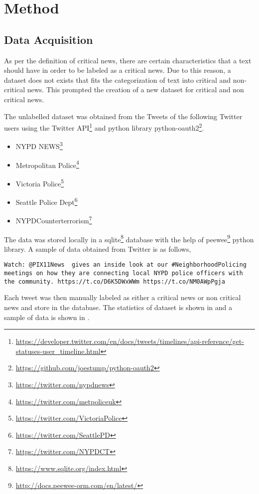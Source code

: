 \chapter{Method} \label{method}

\section{Data Acquisition}
As per the definition of critical news, there are certain characteristics that a text should have in order to be labeled as a critical news. Due to this reason, a dataset does not exists that fits the categorization of text into critical and non-critical news. This prompted the creation of a new dataset for critical and non critical news.\par
The unlabelled dataset was obtained from the Tweets of the following Twitter users using the Twitter API\footnote{\url{https://developer.twitter.com/en/docs/tweets/timelines/api-reference/get-statuses-user_timeline.html}} and python library python-oauth2\footnote{\url{https://github.com/joestump/python-oauth2}}.

\begin{itemize}
    \item NYPD NEWS\footnote{\url{https://twitter.com/nypdnews}}
    \item Metropolitan Police\footnote{\url{https://twitter.com/metpoliceuk}}
    \item  Victoria Police\footnote{\url{https://twitter.com/VictoriaPolice}}
    \item Seattle Police Dept\footnote{\url{https://twitter.com/SeattlePD}}
    \item NYPDCounterterrorism\footnote{\url{https://twitter.com/NYPDCT}}
\end{itemize}

The data was stored locally in a sqlite\footnote{\url{https://www.sqlite.org/index.html}} database with the help of peewee\footnote{\url{http://docs.peewee-orm.com/en/latest/}} python library. A sample of data obtained from Twitter is as follows,

\begin{verbatim}
Watch: @PIX11News  gives an inside look at our #NeighborhoodPolicing
meetings on how they are connecting local NYPD police officers with
the community. https://t.co/D6K5DWxWWm https://t.co/NM0AWpPgja
\end{verbatim}

Each tweet was then manually labeled as either a critical news or non critical news and store in the database. The statistics of dataset is shown in  and a sample of data is shown in .

